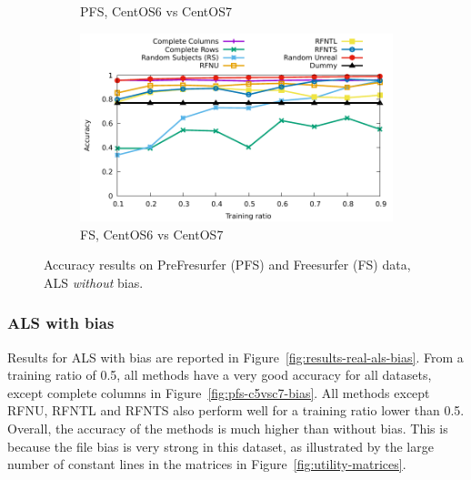 \documentclass[10pt, conference, compsocconf]{IEEEtran}
\begin{document}
\begin{figure}
\begin{subfigure}[b]{\columnwidth}
        \caption{PFS, CentOS6 vs CentOS7}
\end{subfigure}\hfill
\begin{subfigure}[b]{\columnwidth}
        \includegraphics[width=0.8\columnwidth]{data/results/means_of_results/ALS/FS-100files/ALS-FS100files.pdf}
        \caption{FS, CentOS6 vs CentOS7}
\end{subfigure}
\caption{Accuracy results on PreFresurfer (PFS) and Freesurfer (FS) data, ALS \emph{without} bias.}
\label{fig:results-real-als}
\end{figure}

\subsubsection{ALS with bias}

Results for ALS with bias are reported in 
Figure~\ref{fig:results-real-als-bias}. From a training ratio of 0.5, 
all methods have a very good accuracy for all datasets, except complete 
columns in Figure~\ref{fig:pfs-c5vsc7-bias}. All methods except RFNU, 
RFNTL and RFNTS also perform well for a training ratio lower than 0.5. 
Overall, the accuracy of the methods is much higher than without bias. 
This is because the file bias is very strong in this dataset, as 
illustrated by the large number of constant lines in the matrices in 
Figure~\ref{fig:utility-matrices}.
\end{document}
